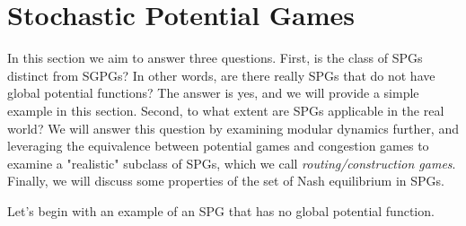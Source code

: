 \section{Stochastic Potential Games}
\label{sec:spg}

In this section we aim to answer three questions. First, is the class of SPGs distinct from SGPGs? In other words, are there really SPGs that do not have global potential functions? The answer is yes, and we will provide a simple example in this section. Second, to what extent are SPGs applicable in the real world? We will answer this question by examining modular dynamics further, and leveraging the equivalence between potential games and congestion games to examine a "realistic" subclass of SPGs, which we call {\em routing/construction games}. Finally, we will discuss some properties of the set of Nash equilibrium in SPGs.

Let's begin with an example of an SPG that has no global potential function.

